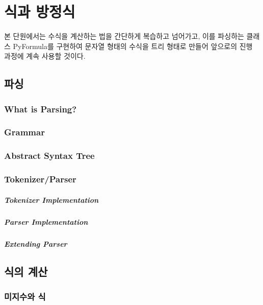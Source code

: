 
\chapter{식과 방정식}

본 단원에서는 수식을 계산하는 법을 간단하게 복습하고 넘어가고, 이를 파싱하는 클래스 PyFormula를 구현하여 문자열 형태의 수식을 트리 형태로 만들어 앞으로의 진행 과정에 계속 사용할 것이다. 

\section{파싱} 

\subsection{What is Parsing?}

\subsection{Grammar} 

\subsection{Abstract Syntax Tree}


\subsection{Tokenizer/Parser} 

\paragraph{Tokenizer Implementation} 
\paragraph{Parser Implementation} 

\paragraph{Extending Parser} 

\section{식의 계산} 




\subsection{미지수와 식} 



